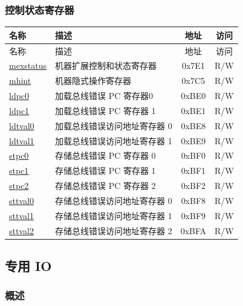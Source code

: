 \documentclass[main\_\_CN.tex]{subfiles}
\begin{document}
\subsubsection{控制状态寄存器}
\label{sec:riscvcpu-buserr-csr}

\begin{longtable}{ | p{4.0cm} | p{8.4cm} | c | c| }
\hline\rowcolor{lightgray}
名称 & 描述 & 地址 & 访问 \\ \hline
\endfirsthead
\hline
\rowcolor{lightgray}
名称 & 描述 & 地址 & 访问  \\
\hline
\endhead
\endfoot

\hyperref[regdesc:MEXSTATUS]{mexstatus} & 机器扩展控制和状态寄存器 & 0x7E1 & R/W \\\hline
\hyperref[regdesc:MHINT]{mhint} & 机器隐式操作寄存器 & 0x7C5 & R/W \\\hline
\hyperref[regdesc:LDPC0]{ldpc0} & 加载总线错误 PC 寄存器0 & 0xBE0 & R/W \\\hline
\hyperref[regdesc:LDPC1]{ldpc1} & 加载总线错误 PC 寄存器 1 & 0xBE1 & R/W \\\hline
\hyperref[regdesc:LDTVAL0]{ldtval0} & 加载总线错误访问地址寄存器 0 & 0xBE8 & R/W \\\hline
\hyperref[regdesc:LDTVAL1]{ldtval1} & 加载总线错误访问地址寄存器 1 & 0xBE9 & R/W \\\hline
\hyperref[regdesc:STPC0]{stpc0} & 存储总线错误 PC 寄存器 0 & 0xBF0 & R/W \\\hline
\hyperref[regdesc:STPC1]{stpc1} & 存储总线错误 PC 寄存器 1 & 0xBF1 & R/W \\\hline
\hyperref[regdesc:STPC2]{stpc2} & 存储总线错误 PC 寄存器 2 & 0xBF2 & R/W \\\hline
\hyperref[regdesc:STTVAL0]{sttval0} & 存储总线错误访问地址寄存器 0 & 0xBF8 & R/W \\\hline
\hyperref[regdesc:STTVAL1]{sttval1} & 存储总线错误访问地址寄存器 1 & 0xBF9 & R/W \\\hline
\hyperref[regdesc:STTVAL2]{sttval2} & 存储总线错误访问地址寄存器 2 & 0xBFA & R/W \\\hline
\end{longtable}

\newpage
\subsection{专用 IO}
\label{sec:riscvcpu-fastio}
\subsubsection{概述}
\label{sec:riscvcpu-fastio-overview}
\end{document}
